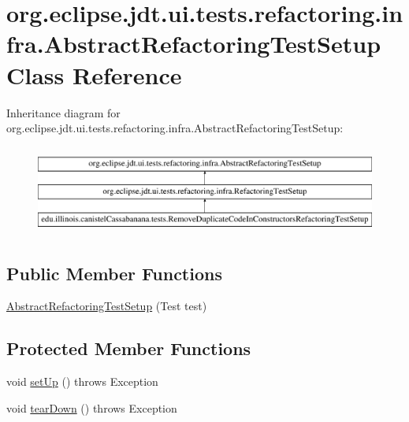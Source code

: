 \hypertarget{classorg_1_1eclipse_1_1jdt_1_1ui_1_1tests_1_1refactoring_1_1infra_1_1AbstractRefactoringTestSetup}{
\section{org.eclipse.jdt.ui.tests.refactoring.infra.AbstractRefactoringTestSetup Class Reference}
\label{classorg_1_1eclipse_1_1jdt_1_1ui_1_1tests_1_1refactoring_1_1infra_1_1AbstractRefactoringTestSetup}
}
Inheritance diagram for org.eclipse.jdt.ui.tests.refactoring.infra.AbstractRefactoringTestSetup:\begin{figure}[H]
\begin{center}
\leavevmode
\includegraphics[height=2.962963cm]{classorg_1_1eclipse_1_1jdt_1_1ui_1_1tests_1_1refactoring_1_1infra_1_1AbstractRefactoringTestSetup}
\end{center}
\end{figure}
\subsection*{Public Member Functions}
\begin{DoxyCompactItemize}
\item 
\hyperlink{classorg_1_1eclipse_1_1jdt_1_1ui_1_1tests_1_1refactoring_1_1infra_1_1AbstractRefactoringTestSetup_a7f057eb1025e327fd19741eb5f4f3a53}{AbstractRefactoringTestSetup} (Test test)
\end{DoxyCompactItemize}
\subsection*{Protected Member Functions}
\begin{DoxyCompactItemize}
\item 
void \hyperlink{classorg_1_1eclipse_1_1jdt_1_1ui_1_1tests_1_1refactoring_1_1infra_1_1AbstractRefactoringTestSetup_a0c786e78cbff56cd02811a7376ef7b5f}{setUp} ()  throws Exception 
\item 
void \hyperlink{classorg_1_1eclipse_1_1jdt_1_1ui_1_1tests_1_1refactoring_1_1infra_1_1AbstractRefactoringTestSetup_a64befeff9fba889aac527480b952e971}{tearDown} ()  throws Exception 
\end{DoxyCompactItemize}

